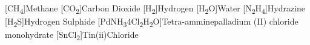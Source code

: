 \begin{acronym}
    [CH\textsubscript{4}]{Methane}
    [CO\textsubscript{2}]{Carbon Dioxide}
    [H\textsubscript{2}]{Hydrogen}
    [H\textsubscript{2}O]{Water}
    [N\textsubscript{2}H\textsubscript{4}]{Hydrazine}
    [H\textsubscript{2}S]{Hydrogen Sulphide}
    [PdNH\textsubscript{3}4Cl\textsubscript{2}H\textsubscript{2}O]{Tetra-amminepalladium (II) chloride monohydrate}
    [SnCl\textsubscript{2}]{Tin(ii)Chloride}

\end{acronym}

